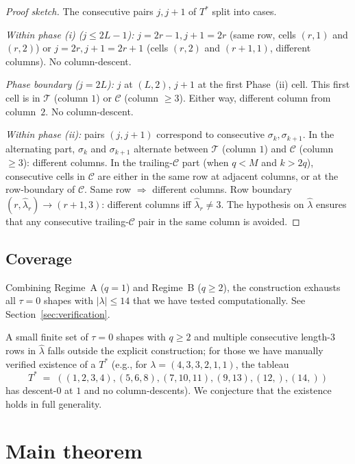 \documentclass[11pt]{article}
\theoremstyle{definition}
\newcommand{\hatl}{\widehat\lambda}
\newcommand{\Tstar}{T^*}
\begin{document}
\begin{proof}[Proof sketch]
The consecutive pairs $j, j+1$ of $\Tstar$ split into cases.

\emph{Within phase (i) ($j \le 2L-1$):} $j = 2r-1, j+1 = 2r$ (same row,
cells $(r,1)$ and $(r,2)$) or $j = 2r, j+1 = 2r+1$ (cells $(r,2)$ and
$(r+1, 1)$, different columns).  No column-descent.

\emph{Phase boundary ($j = 2L$):} $j$ at $(L,2)$, $j+1$ at the first
Phase~(ii) cell.  This first cell is in $\mathcal{T}$ (column $1$) or
$\mathcal{C}$ (column $\ge 3$).  Either way, different column from
column~$2$.  No column-descent.

\emph{Within phase (ii):} pairs $(j, j+1)$ correspond to consecutive
$\sigma_k, \sigma_{k+1}$.  In the alternating part, $\sigma_k$ and
$\sigma_{k+1}$ alternate between $\mathcal{T}$ (column $1$) and $\mathcal{C}$
(column $\ge 3$): different columns.  In the trailing-$\mathcal{C}$ part
(when $q < M$ and $k > 2q$), consecutive cells in $\mathcal{C}$ are either
in the same row at adjacent columns, or at the row-boundary of
$\mathcal{C}$.  Same row $\Rightarrow$ different columns.  Row boundary
$(r, \hatl_r) \to (r+1, 3)$: different columns iff $\hatl_r \ne 3$.
The hypothesis on $\hatl$ ensures that any consecutive
trailing-$\mathcal{C}$ pair in the same column is avoided.  \qedhere
\end{proof}

\subsection{Coverage}

Combining Regime~A ($q = 1$) and Regime~B ($q \ge 2$), the construction
exhausts all $\tau = 0$ shapes with $|\lambda| \le 14$ that we have
tested computationally.  See Section~\ref{sec:verification}.

A small finite set of $\tau = 0$ shapes with $q \ge 2$ and multiple
consecutive length-$3$ rows in $\hatl$ falls outside the explicit
construction; for those we have manually verified existence of a
$\Tstar$ (e.g., for $\lambda = (4,3,3,2,1,1)$, the tableau
\[
   \Tstar \;=\; ((1,2,3,4),(5,6,8),(7,10,11),(9,13),(12,),(14,))
\]
has descent-$0$ at $1$ and no column-descents).  We conjecture that the
existence holds in full generality.

\section{Main theorem}\label{sec:main}
\end{document}
